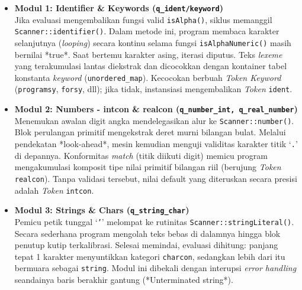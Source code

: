 \documentclass[12pt,a4paper]{article}
\begin{document}
\begin{itemize}
    \item \textbf{Modul 1: Identifier \& Keywords (\texttt{q\_ident/keyword})}\\
    Jika evaluasi mengembalikan fungsi valid \texttt{isAlpha()}, siklus memanggil \texttt{Scanner::identifier()}. Dalam metode ini, program membaca karakter selanjutnya (\textit{looping}) secara kontinu selama fungsi \texttt{isAlphaNumeric()} masih bernilai *true*. Saat bertemu karakter asing, iterasi diputus. Teks \textit{lexeme} yang terakumulasi lantas diekstrak dan dicocokkan dengan kontainer tabel konstanta \textit{keyword} (\texttt{unordered\_map}). Kecocokan berbuah \textit{Token Keyword} (\texttt{programsy}, \texttt{forsy}, dll); jika tidak, instansiasi mengembalikan \textit{Token} \texttt{ident}.

    \item \textbf{Modul 2: Numbers - intcon \& realcon (\texttt{q\_number\_int, q\_real\_number})}\\
    Menemukan awalan digit angka mendelegasikan alur ke \texttt{Scanner::number()}. Blok perulangan primitif mengekstrak deret murni bilangan bulat. Melalui pendekatan *look-ahead*, mesin kemudian menguji validitas karakter titik `\texttt{.}' di depannya. Konformitas \textit{match} (titik diikuti digit) memicu program mengakumulasi komposit tipe nilai primitif bilangan riil (berujung \textit{Token} \texttt{realcon}). Tanpa validasi tersebut, nilai default yang diteruskan secara presisi adalah \textit{Token} \texttt{intcon}.

    \item \textbf{Modul 3: Strings \& Chars (\texttt{q\_string\_char})}\\
    Pemicu petik tunggal `\texttt{'}' melompat ke rutinitas \texttt{Scanner::stringLiteral()}. Secara sederhana program mengolah teks bebas di dalamnya hingga blok penutup kutip terkalibrasi. Selesai memindai, evaluasi dihitung: panjang tepat 1 karakter menyuntikkan kategori \texttt{charcon}, sedangkan lebih dari itu bermuara sebagai \texttt{string}. Modul ini dibekali dengan interupsi \textit{error handling} seandainya baris berakhir gantung (*Unterminated string*).


\end{itemize}
\end{document}
